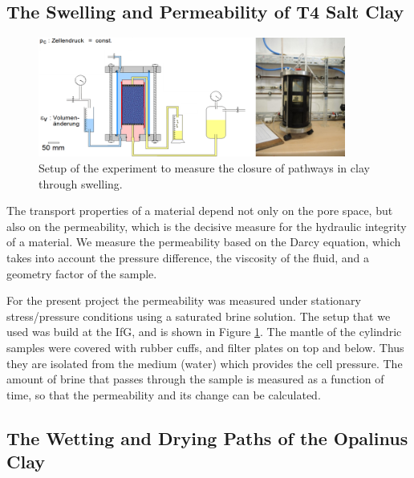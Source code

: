 \subsection{The Swelling and Permeability of T4 Salt Clay}
\label{sec:t4swell}

\begin{figure}[ht]
\centering
\includegraphics[width=0.9\textwidth]{figures/IfG-T4-Perm-aufbau.png}
\caption{Setup of the experiment to measure the closure of pathways in clay through
swelling.}
\label{fig:t4swellsetup}
\end{figure}

The transport properties of a material depend not only on the pore space, but also on the permeability, which is the decisive measure for the hydraulic integrity of a material. We measure the permeability based on the Darcy equation, which takes into account the pressure difference, the viscosity of the fluid, and a geometry factor of the sample.

For the present project the permeability was measured under stationary stress/pressure conditions using a saturated brine solution. The setup that we used was build at the IfG, and is shown in Figure \ref{fig:t4swellsetup}. The mantle of the cylindric samples were covered with rubber cuffs, and filter plates on top and below. Thus they are isolated from the medium (water) which provides the cell pressure. The amount of brine that passes through the sample is measured as a function of time, so that the permeability and its change can be calculated. 


\subsection{The Wetting and Drying Paths of the Opalinus Clay}
\label{sec:Shrinkage_Swelling_Exp}

